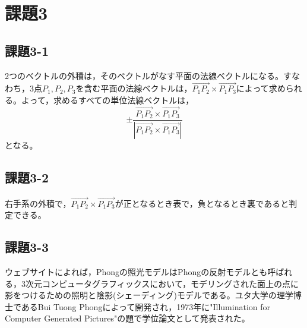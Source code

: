 \documentclass[]{jsarticle}
\begin{document}
\section{課題3}
\subsection{課題3-1}
2つのベクトルの外積は，そのベクトルがなす平面の法線ベクトルになる。すなわち，3点$P_1,P_2,P_3$を含む平面の法線ベクトルは，$\overrightarrow{P_1 P_2}\times\overrightarrow{P_1 P_3}$によって求められる。よって，求めるすべての単位法線ベクトルは，
$$
\pm\frac{\overrightarrow{P_1 P_2}\times\overrightarrow{P_1 P_3}}{|\overrightarrow{P_1 P_2}\times\overrightarrow{P_1 P_3}|}
$$
となる。
\subsection{課題3-2}
右手系の外積で，$\overrightarrow{P_1 P_2}\times\overrightarrow{P_1 P_3}$が正となるとき表で，負となるとき裏であると判定できる。
\subsection{課題3-3}
ウェブサイト\cite{4}によれば，Phongの照光モデルはPhongの反射モデルとも呼ばれる，3次元コンピュータグラフィックスにおいて，モデリングされた面上の点に影をつけるための照明と陰影(シェーディング)モデルである。ユタ大学の理学博士であるBui Tuong Phongによって開発され，1973年に"Illumination for Computer Generated Pictures"の題で学位論文として発表された。
\end{document}
